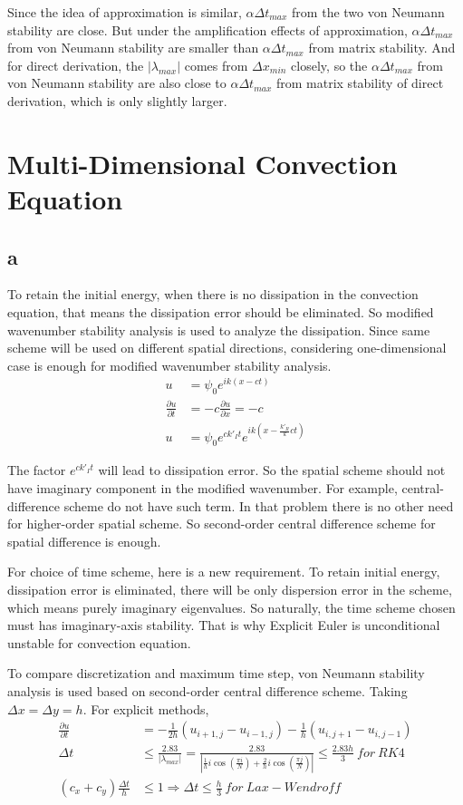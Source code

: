 \documentclass[letterpaper,10pt]{article}
\begin{document}
Since the idea of approximation is similar, $\alpha \Delta t_{max}$ from the two von Neumann stability are close. 
But under the amplification effects of approximation, $\alpha \Delta t_{max}$ from von Neumann stability are smaller than 
$\alpha \Delta t_{max}$ from matrix stability. And for direct derivation, the $|\lambda_{max}|$ comes from $\Delta x_{min}$ closely, 
so the $\alpha \Delta t_{max}$ from von Neumann stability are also close to $\alpha \Delta t_{max}$ from matrix stability of direct derivation, 
which is only slightly larger. 
\section{Multi-Dimensional Convection Equation}
\subsection{a}
To retain the initial energy, when there is no dissipation in the convection equation, that means the dissipation error should be eliminated. 
So modified wavenumber stability analysis is used to analyze the dissipation. Since same scheme will be used on different spatial directions, 
considering one-dimensional case is enough for modified wavenumber stability analysis. 
\begin{align*}
  u&=\psi_0 e^{ik(x-ct)}\\
  \frac{\partial u}{\partial t}&= -c\frac{\partial u}{\partial x}=-c\\
  u&=\psi_0 e^{ck'_It} e^{ik\left(x-\frac{k'_R}{k}ct\right)}
\end{align*}

The factor $e^{ck'_It}$ will lead to dissipation error. So the spatial scheme should not have imaginary component in the modified wavenumber. 
For example, central-difference scheme do not have such term. In that problem there is no other need for higher-order spatial scheme. So 
second-order central difference scheme for spatial difference is enough. 

For choice of time scheme, here is a new requirement. To retain initial energy, dissipation error is eliminated, there will be only dispersion error in 
the scheme, which means purely imaginary eigenvalues. So naturally, the time scheme chosen must has imaginary-axis stability. That is why 
Explicit Euler is unconditional unstable for convection equation. 

To compare discretization and maximum time step, von Neumann stability analysis is used based on second-order central difference scheme. Taking 
$\Delta x=\Delta y=h$. For explicit methods, 
\begin{align*}
  \frac{\partial u}{\partial t}&=-\frac{1}{2h}\left(u_{i+1,j}-u_{i-1,j}\right)-\frac{1}{h}\left(u_{i,j+1}-u_{i,j-1}\right)\\
  \Delta t &\leq \frac{2.83}{|\lambda_{max}|}=\frac{2.83}{|\frac{1}{h}i\cos\left(\frac{\pi i}{N}\right)+\frac{2}{h}i\cos\left(\frac{\pi j}{N}\right)|}
  \leq \frac{2.83 h}{3}~for~RK4\\
  (c_x+c_y)\frac{\Delta t}{h}&\leq 1\Rightarrow \Delta t\leq\frac{h}{3}~for~Lax-Wendroff
\end{align*}
\end{document}
